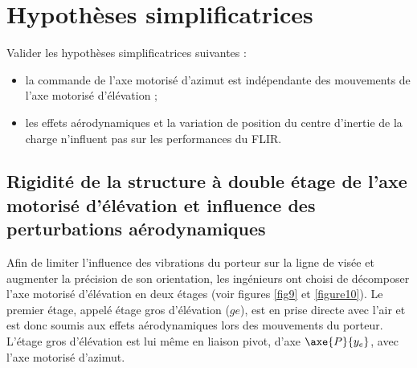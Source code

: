\section{Hypothèses simplificatrices}

\begin{obj}
Valider les hypothèses simplificatrices suivantes :
\begin{itemize}
\item la commande de l'axe motorisé d'azimut est indépendante des mouvements de l'axe motorisé
d'élévation ;
\item  les effets aérodynamiques et la variation de position du centre d'inertie de la charge n'influent pas
sur les performances du FLIR.
\end{itemize}
\end{obj}




%
%


\subsection{Rigidité de la structure à double étage de l'axe motorisé d'élévation et influence des
perturbations aérodynamiques}


Afin de limiter l'influence des vibrations du porteur sur la ligne de visée et augmenter la précision de son orientation, les ingénieurs ont choisi de décomposer l'axe motorisé d'élévation en deux étages (voir figures \ref{fig9} et \ref{figure10}). 
Le premier étage, appelé étage gros d'élévation ($ge$), est en prise directe avec l'air et est donc soumis aux effets aérodynamiques lors des mouvements du porteur. L'étage gros d'élévation est lui même en liaison pivot, d'axe $\axe{P}{{y_e}}$, avec l'axe motorisé d'azimut.

